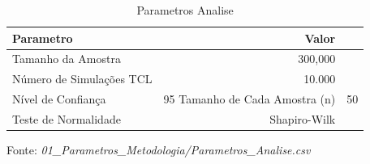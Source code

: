 \begin{table}[H]
\centering
\small
\caption{Parametros Analise}
\label{tab:01_01_Parametros_Metodologia}
\begin{tabular}{|l|r|}
\hline
\textbf{Parametro} & \textbf{Valor} \\
\hline
Tamanho da Amostra & 300,000 \\
Número de Simulações TCL & 10.000 \\
Nível de Confiança & 95%
Tamanho de Cada Amostra (n) & 50 \\
Teste de Normalidade & Shapiro-Wilk \\
\hline
\end{tabular}
\begin{flushleft}
\small Fonte: \textit{01_Parametros_Metodologia/Parametros_Analise.csv}
\end{flushleft}
\end{table}
